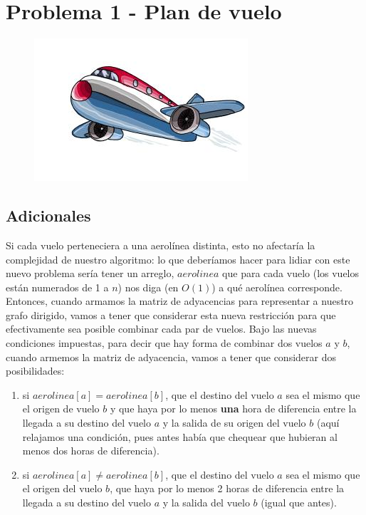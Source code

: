 \documentclass[11pt, a4paper, twoside]{article}
\begin{document}


\clearpage
\section{Problema 1 - Plan de vuelo}

\begin{figure}[H]
\centering
\includegraphics[scale=0.5]{imagenes/plane.jpg}
\end{figure}

\subsection{Adicionales}
Si cada vuelo perteneciera a una aerolínea distinta, esto no afectaría la complejidad
de nuestro algoritmo: lo que deberíamos hacer para lidiar con este nuevo problema 
sería tener un arreglo, $aerolinea$ que para cada vuelo (los vuelos están numerados de 1 a $n$) nos
diga (en $O(1)$) a qué aerolínea corresponde. Entonces, cuando armamos la matriz de 
adyacencias para representar a nuestro grafo dirigido, vamos a tener que considerar esta
nueva restricción para que efectivamente sea posible combinar cada par de vuelos. Bajo las
nuevas condiciones impuestas, para decir que hay forma de combinar dos vuelos $a$ y $b$, 
cuando armemos la matriz de adyacencia, vamos a tener que considerar dos posibilidades: 
\begin{enumerate}
	\item si $aerolinea[a] = aerolinea[b]$, que el destino del vuelo $a$ sea el mismo que 
	el origen de vuelo $b$ y que haya por lo menos \textbf{una} hora de diferencia entre la llegada 
	a su destino del vuelo $a$ y la salida de su origen del vuelo $b$ (aquí relajamos una 
	condición, pues antes había que chequear que hubieran al menos dos horas de diferencia).
	\item si $aerolinea[a] \neq aerolinea[b]$, que el destino del vuelo $a$ sea el mismo que
	el origen del vuelo $b$, que haya por lo menos 2 horas de diferencia entre la llegada a su
	destino del vuelo $a$ y la salida del vuelo $b$ (igual que antes).
\end{enumerate}
\end{document}
